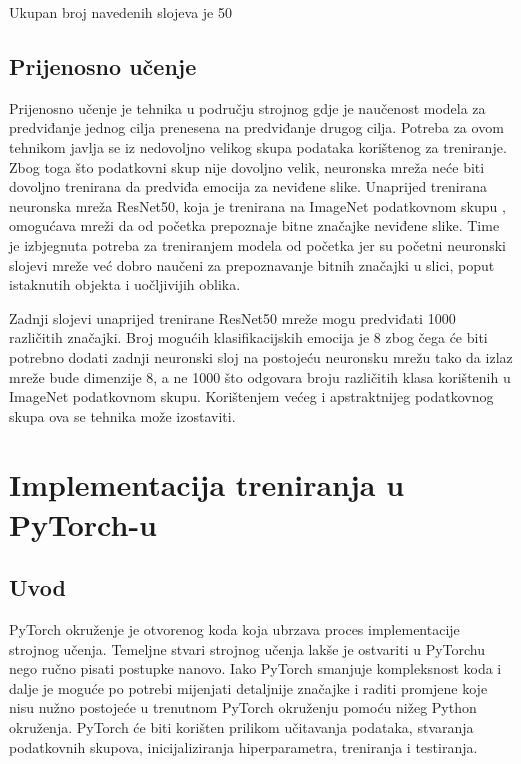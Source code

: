 \documentclass[times, utf8, zavrsni,numeric,pstricks]{fer}
\begin{document}
Ukupan broj navedenih slojeva je 50


\subsection{Prijenosno učenje}\label{transfered_learning}

Prijenosno učenje je tehnika u području strojnog gdje je naučenost modela za predviđanje jednog cilja prenesena na predviđanje drugog cilja. Potreba za ovom tehnikom javlja se iz nedovoljno velikog skupa podataka korištenog za treniranje. Zbog toga što podatkovni skup nije dovoljno velik, neuronska mreža neće biti dovoljno trenirana da predviđa emocija za neviđene slike. Unaprijed trenirana neuronska mreža ResNet50, koja je trenirana na ImageNet podatkovnom skupu \cite{imagenet}, omogućava mreži da od početka prepoznaje bitne značajke neviđene slike. Time je izbjegnuta potreba za treniranjem modela od početka jer su početni neuronski slojevi mreže već dobro naučeni za prepoznavanje bitnih značajki u slici, poput istaknutih objekta i uočljivijih oblika.

Zadnji slojevi unaprijed trenirane ResNet50 mreže mogu predviđati 1000 različitih značajki. Broj mogućih klasifikacijskih emocija je 8 zbog čega će biti potrebno dodati zadnji neuronski sloj na postojeću neuronsku mrežu tako da izlaz mreže bude dimenzije 8, a ne 1000 što odgovara broju različitih klasa korištenih u ImageNet podatkovnom skupu. Korištenjem većeg i apstraktnijeg podatkovnog skupa ova se tehnika može izostaviti.


\section{Implementacija treniranja u PyTorch-u}

\subsection{Uvod}

PyTorch okruženje je otvorenog koda  koja ubrzava proces implementacije strojnog učenja. Temeljne stvari strojnog učenja lakše je ostvariti u PyTorchu nego ručno pisati postupke nanovo. Iako PyTorch smanjuje kompleksnost koda i dalje je moguće po potrebi mijenjati detaljnije značajke i raditi promjene koje nisu nužno postojeće u trenutnom PyTorch okruženju pomoću nižeg Python okruženja. PyTorch će biti korišten prilikom učitavanja podataka, stvaranja podatkovnih skupova, inicijaliziranja hiperparametra, treniranja i testiranja.
\end{document}
